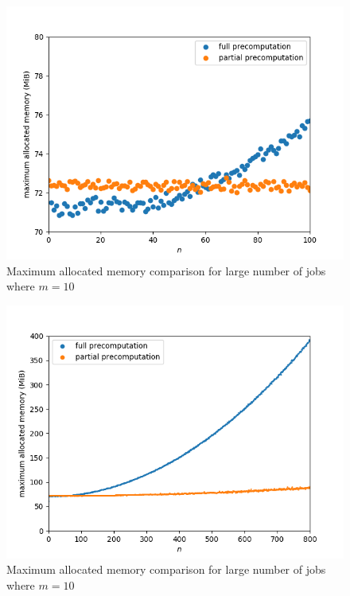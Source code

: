 \begin{figure}[H]
	\centering
	\includegraphics[scale=0.6]{figures/precomputation_memory_small}
	\caption{Maximum allocated memory comparison for large number of jobs where $m=10$}
\end{figure}

\begin{figure}[H]
	\centering
	\includegraphics[scale=0.6]{figures/precomputation_memory_big}
	\caption{Maximum allocated memory comparison for large number of jobs where $m=10$}
\end{figure}